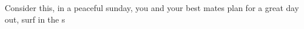 Consider this, in a peaceful sunday, you and your best mates plan for a great day out, surf in the s 